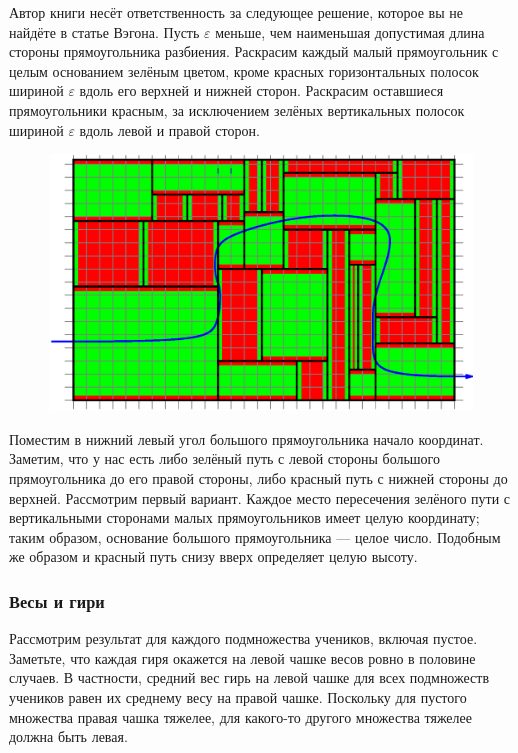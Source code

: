 Автор книги несёт ответственность за следующее решение, которое вы не найдёте в статье Вэгона.
Пусть $\varepsilon$ меньше, чем наименьшая допустимая длина стороны прямоугольника разбиения.
Раскрасим каждый малый прямоугольник с целым основанием зелёным цветом, кроме красных горизонтальных полосок шириной $\varepsilon$ вдоль его верхней и нижней сторон.
Раскрасим оставшиеся прямоугольники красным, за исключением зелёных вертикальных полосок шириной $\varepsilon$ вдоль левой и правой сторон.

\begin{figure}[h!]
\centering
\includegraphics[scale=0.5]{Figs/Insight/green}
\end{figure}

Поместим в нижний левый угол большого прямоугольника начало координат.
Заметим, что у нас есть либо зелёный путь с левой стороны большого прямоугольника до его правой стороны, либо красный путь с нижней стороны до верхней.
Рассмотрим первый вариант.
Каждое место пересечения зелёного пути с вертикальными сторонами малых прямоугольников имеет целую координату; таким образом, основание большого прямоугольника --- целое число.
Подобным же образом и красный путь снизу вверх определяет целую высоту.

\subsubsection*{Весы и гири} %

Рассмотрим результат для каждого подмножества учеников, включая пустое.
Заметьте, что каждая гиря окажется на левой чашке весов ровно в половине случаев.
В частности, средний вес гирь на левой чашке для всех подмножеств учеников равен их среднему весу на правой чашке.
Поскольку для пустого множества правая чашка тяжелее, 
для какого-то другого множества тяжелее должна быть левая.\heart

